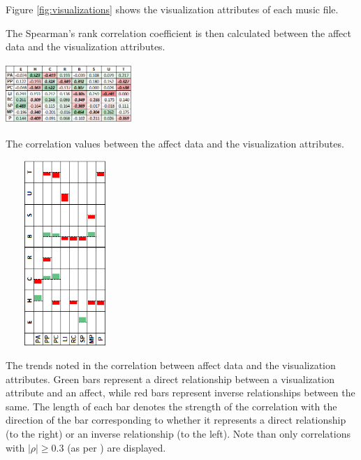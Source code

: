 \documentclass{sigchi-ext}
\begin{document}
Figure \ref{fig:visualizations} shows the visualization attributes of each music file.

The Spearman's rank correlation coefficient is then calculated between the affect data and the visualization attributes. 

\begin{marginfigure}[-4pc]
\begin{minipage}{\marginparwidth}
     \includegraphics[width=4.75cm,height=2.3cm]{figures/AffectVisualization.png}
    \caption{The correlation values between the affect data and the visualization attributes.}
    \label{fig:correlation}
    \end{minipage}
\end{marginfigure}

\begin{marginfigure}[0pc]
\begin{minipage}{\marginparwidth}
     \includegraphics[width=4.5cm,height=7cm]{figures/TrendsNew_Rotated.png}
    \caption{The trends noted in the correlation between affect data and the visualization attributes. Green bars represent a direct relationship between a visualization attribute and an affect, while red bars represent inverse relationships between the same. The length of each bar denotes the strength of the correlation with the direction of the bar corresponding to whether it represents a direct relationship (to the right) or an inverse relationship (to the left). Note than only correlations with $|\rho| \geq 0.3$ (as per \cite{Cohen:1988}) are displayed.}
    \label{fig:trends}
    \end{minipage}
\end{marginfigure}
\end{document}
